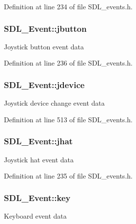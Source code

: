 Definition at line 234 of file S\+D\+L\+\_\+events.\+h.

\hypertarget{unionSDL__Event_a591104d64903ae1cf70874fb5d3124ff}{
\subsubsection[{jbutton}]{ S\+D\+L\+\_\+\+Event\+::jbutton}}\label{unionSDL__Event_a591104d64903ae1cf70874fb5d3124ff}
Joystick button event data 

Definition at line 236 of file S\+D\+L\+\_\+events.\+h.

\hypertarget{unionSDL__Event_a17514dc19a846ea1b5fbe44123700c4c}{
\subsubsection[{jdevice}]{ S\+D\+L\+\_\+\+Event\+::jdevice}}\label{unionSDL__Event_a17514dc19a846ea1b5fbe44123700c4c}
Joystick device change event data 

Definition at line 513 of file S\+D\+L\+\_\+events.\+h.

\hypertarget{unionSDL__Event_a421b40e0f8e01f181c8d5548cff1dd1d}{
\subsubsection[{jhat}]{ S\+D\+L\+\_\+\+Event\+::jhat}}\label{unionSDL__Event_a421b40e0f8e01f181c8d5548cff1dd1d}
Joystick hat event data 

Definition at line 235 of file S\+D\+L\+\_\+events.\+h.

\hypertarget{unionSDL__Event_ab99927835cc77a9b6bb50b419b4a27df}{
\subsubsection[{key}]{ S\+D\+L\+\_\+\+Event\+::key}}\label{unionSDL__Event_ab99927835cc77a9b6bb50b419b4a27df}
Keyboard event data 

